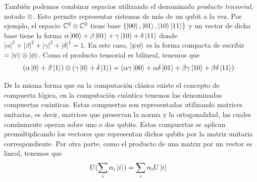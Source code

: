 También podemos combinar espacios utilizando el denominado \textit{producto tensorial}, notado \( \otimes \). Esto permite representar sistemas de más de un qubit a la vez.
Por ejemplo, el espacio \( \mathbb{C}^2 \otimes \mathbb{C}^2 \) tiene base \( \{\ket{00}, \ket{01}, \ket{10} \ket{11}\} \) y un vector de dicha base tiene la forma \( \alpha \ket{00} + \beta \ket{01} + \gamma \ket{10} + \delta \ket{11} \) donde \( |\alpha|^2 + |\beta|^2 + |\gamma|^2 + |\delta|^2 = 1 \).
En este caso, \( \ket{\psi \phi} \) es la forma compacta de escribir \( = \ket{\psi} \otimes \ket{\phi} \).
Como el producto tensorial es bilineal, tenemos que
\[
  (\alpha \ket{0} + \beta \ket{1}) \otimes (\gamma \ket{0} + \delta \ket{1}) = (\alpha \gamma \ket{00} + \alpha \delta \ket{01} + \beta \gamma \ket{10} + \beta \delta \ket{11})
\]

De la misma forma que en la computación clásica existe el concepto de compuerta lógica, en la computación cuántica tenemos las denominadas compuertas cuánticas. Estas compuertas son representadas utilizando matrices unitarias, es decir, matrices que preservan la norma y la ortogonalidad, las cuales comúnmente operan sobre uno o dos qubits. Estas compuertas se aplican premultiplicando los vectores que representan dichos qubits por la matriz unitaria correspondiente. Por otra parte, como el producto de una matriz por un vector es lineal, tenemos que
\[
  U (\sum_i \alpha_i \ket{i}) = \sum_i \alpha_i U \ket{i}
\]

